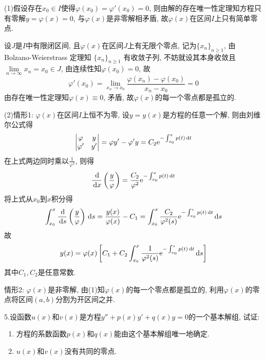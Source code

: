 \begin{solve}
(1)假设存在$x_0\in I$使得$\varphi(x_0)=\varphi'(x_0)=0$, 
则由解的存在唯一性定理知方程只有零解$y=\varphi(x)=0$, 与$\varphi(x)$是非零解相矛盾, 
故$\varphi(x)$在区间$I$上只有简单零点.

设$J$是$I$中有限闭区间, 且$\varphi(x)$在区间$J$上有无限个零点, 记为$\{x_n\}_{n\geq 1}$, 
由 Bolzano-Weierstrass 定理知 $\{x_n\}_{n\geq 1}$ 有收敛子列, 
不妨就设其本身收敛且 $\lim\limits_{n\to\infty}x_n=x_0\in J$, 由连续性知$\varphi(x_0)=0$, 故
\[\varphi'(x_0)=\lim_{x_n\to x_0}\frac{\varphi(x_n)-\varphi(x_0)}{x_n-x_0}=0\]
由存在唯一性定理知$\varphi(x)\equiv0$, 矛盾, 故$\varphi(x)$的每一个零点都是孤立的.

(2)情形1: $\varphi(x)$在区间$I$上恒不为零, 设$y=y(x)$是方程的任意一个解, 则由刘维尔公式得
\[\begin{vmatrix}\varphi&y\\\varphi'&y'\end{vmatrix}=\varphi y'-\varphi'y=C_2\mathrm{e}^{-\int_{x_0}^xp(t)\,\mathrm{d} t}\]
在上式两边同时乘以$\frac{1}{\varphi^2}$, 则得
\[\frac{\,\mathrm{d}}{\,\mathrm{d} x}\left(\frac{y}{\varphi}\right)=\frac{C_2}{\varphi^2}\mathrm{e}^{-\int_{x_0}^xp(t)\,\mathrm{d} t}\]
将上式从$x_0$到$x$积分得
\[\int_{x_0}^x\frac{\,\mathrm{d}}{\,\mathrm{d} s}\left(\frac{y}{\varphi}\right)\,\mathrm{d} s=\frac{y(x)}{\varphi(x)}-C_1=\int_{x_0}^x\frac{C_2}{\varphi^2(s)}\mathrm{e}^{-\int_{x_0}^sp(t)\,\mathrm{d} t}\,\mathrm{d} s\]
故\[y(x)=\varphi(x)\left[C_1+C_2\int_{x_0}^x\frac{1}{\varphi^2(s)}\mathrm{e}^{-\int_{x_0}^sp(t)\,\mathrm{d} t}\,\mathrm{d} s\right]\]
其中$C_1,C_2$是任意常数.

情形2: $\varphi(x)$是非零解, 由(1)知$\varphi(x)$的每一个零点都是孤立的, 利用$\varphi(x)$的零点将区间$(a,b)$分割为开区间之并.
\end{solve}


5.设函数$u(x)$和$v(x)$是方程$y''+p(x)y'+q(x)y=0$的一个基本解组, 试证:
\begin{enumerate}[(1)]
\item 方程的系数函数$p(x)$和$q(x)$能由这个基本解组唯一地确定.
\item $u(x)$和$v(x)$没有共同的零点.
\end{enumerate}

